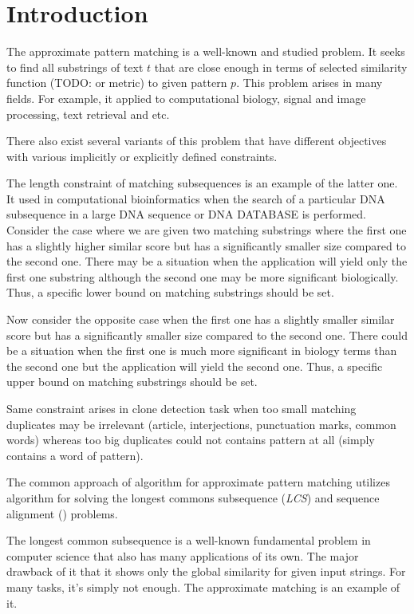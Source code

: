 \section{Introduction}
The approximate pattern matching is a well-known and studied problem.
It seeks to find all substrings of text $t$ that are close enough in terms of selected similarity function (TODO: or metric) to given pattern $p$.
This problem arises in many fields.
For example,  it applied to computational biology, signal and image processing, text retrieval and etc.



There also exist several variants of this problem that have different objectives with various implicitly or explicitly defined constraints.

The length constraint of matching subsequences is an example of the latter one.
It used in computational bioinformatics when the search  of a particular DNA subsequence in
a large DNA sequence or DNA DATABASE is performed.
Consider the case where we are given two matching substrings where the first one has a slightly higher similar score but has a significantly smaller size compared to the second one.
There may be a situation when the application will yield only the first one substring although the second one may be more significant biologically.
Thus, a specific lower bound on matching substrings should be set.

Now consider the opposite case when the first one has a slightly smaller similar score but has a significantly smaller size compared to the second one.
There could be a situation when the first one is much more significant in biology terms than the second one but the application will yield the second one. 
Thus, a specific upper bound on matching substrings should be set.

Same constraint arises in clone detection task when too small matching duplicates may be irrelevant  (article, interjections, punctuation marks, common words) whereas too big duplicates could not contains pattern at all (simply contains a word of pattern).


The common approach of algorithm for approximate pattern matching utilizes  algorithm for solving the longest commons subsequence (\emph{LCS}) and sequence alignment ()  problems.

The longest common subsequence is a well-known fundamental problem in computer science that also has many applications of its own.
The major drawback of it that it shows only the global similarity for given input strings.
For many tasks, it's simply not enough.
The approximate matching is an example of it.

